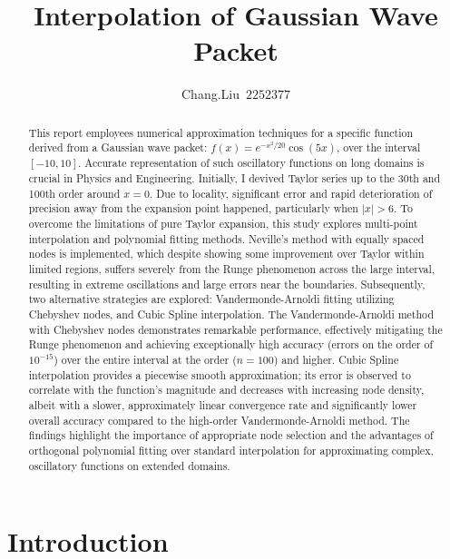 \documentclass[11pt]{article}
\title{Interpolation of Gaussian Wave Packet}
\author{Chang.Liu\ $\mathrm{2252377}$}
\date{} %
\begin{document}
\maketitle  %

\setcounter{page}{1} 
\setcounter{equation}{0}


\begin{abstract}
  
This report employees numerical approximation techniques for a specific function derived from a Gaussian wave 
packet: $f(x) = e^{-x^2/20} \cos(5x)$, over the interval $[-10, 10]$. Accurate representation of such oscillatory functions on 
long domains is crucial in  Physics and Engineering. Initially, I devived Taylor series up to the 30th and 100th 
order around $x=0$. Due to locality, significant error and rapid deterioration of precision away from the expansion point happened, 
particularly when $|x| > 6$. To overcome the limitations of pure Taylor expansion, this study 
explores multi-point interpolation and polynomial fitting methods. Neville's method with equally spaced nodes is implemented, which despite 
showing some improvement over Taylor within limited regions, suffers severely from the Runge phenomenon across the large interval, resulting 
in extreme oscillations and large errors near the boundaries. Subsequently, two alternative strategies are explored: Vandermonde-Arnoldi fitting 
utilizing Chebyshev nodes, and Cubic Spline interpolation. The Vandermonde-Arnoldi method with Chebyshev nodes demonstrates remarkable 
performance, effectively mitigating the Runge phenomenon and achieving exceptionally high accuracy (errors on the order of $10^{-15}$) 
over the entire interval at the order ($n=100$) and higher. Cubic Spline interpolation provides a piecewise smooth approximation; 
its error is observed to correlate with the function's magnitude and decreases with increasing node density, albeit with a slower, approximately 
linear convergence rate and significantly lower overall accuracy compared to the high-order Vandermonde-Arnoldi method. The findings highlight 
the importance of appropriate node selection and the advantages of orthogonal polynomial fitting over standard interpolation for approximating 
complex, oscillatory functions on extended domains.

\end{abstract}

\section{Introduction} 
\end{document}
